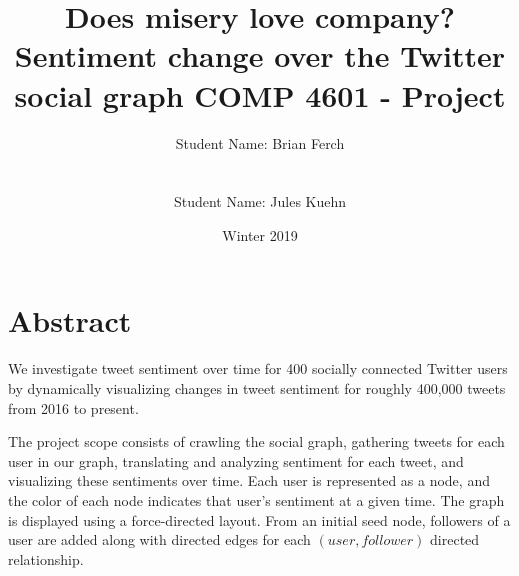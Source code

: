 \documentclass[11pt]{article}
\begin{document}
\title {
    Does misery love company?\\
    Sentiment change over the Twitter social graph\newline\newline
    \large COMP 4601 - Project}
\author{Student Name: Brian Ferch\\
\\\\ 
Student Name: Jules Kuehn\\
}
\date{Winter 2019}
\maketitle


% 



\section{Abstract}

We investigate tweet sentiment over time for 400 socially connected Twitter users by dynamically visualizing changes in tweet sentiment for roughly 400,000 tweets from 2016 to present.\newline

The project scope consists of crawling the social graph, gathering tweets for each user in our graph, translating and analyzing sentiment for each tweet, and visualizing these sentiments over time. Each user is represented as a node, and the color of each node indicates that user’s sentiment at a given time. The graph is displayed using a force-directed layout. From an initial seed node, followers of a user are added along with directed edges for each $(user, follower)$ directed relationship.
\end{document}
